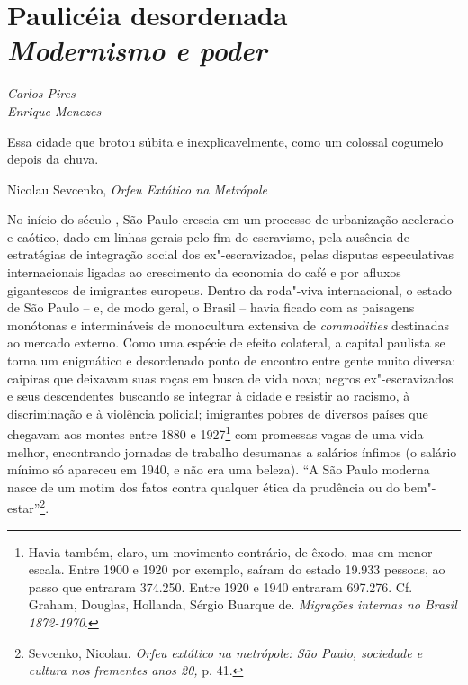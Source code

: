 \chapter*{Paulicéia desordenada\\ \emph{Modernismo e poder}}

\begin{flushright}
\emph{Carlos Pires\\ Enrique Menezes}
\end{flushright}

\epigraph{Essa cidade que brotou súbita e inexplicavelmente,
como um colossal cogumelo depois da chuva.}{Nicolau Sevcenko, \emph{Orfeu Extático na Metrópole}}

No início do século , São Paulo crescia em um processo de urbanização
acelerado e caótico, dado em linhas gerais pelo fim do escravismo, pela
ausência de estratégias de integração social dos ex"-escravizados, pelas
disputas especulativas internacionais ligadas ao crescimento da economia
do café e por afluxos gigantescos de imigrantes europeus. Dentro da
roda"-viva internacional, o estado de São Paulo -- e, de modo geral, o
Brasil -- havia ficado com as paisagens monótonas e intermináveis de
monocultura extensiva de \emph{commodities} destinadas ao mercado
externo. Como uma espécie de efeito colateral, a capital paulista se
torna um enigmático e desordenado ponto de encontro entre gente muito
diversa: caipiras que deixavam suas roças em busca de vida nova; negros
ex"-escravizados e seus descendentes buscando se integrar à cidade e
resistir ao racismo, à discriminação e à violência policial; imigrantes
pobres de diversos países que chegavam aos montes entre 1880 e
1927\footnote{Havia também, claro, um movimento contrário, de êxodo, mas
  em menor escala. Entre 1900 e 1920 por exemplo, saíram do estado
  19.933 pessoas, ao passo que entraram 374.250. Entre 1920 e 1940
  entraram 697.276. Cf. Graham, Douglas, Hollanda, Sérgio Buarque de.
  \emph{Migrações internas no Brasil 1872-1970}.} com promessas vagas de
uma vida melhor, encontrando jornadas de trabalho desumanas a salários
ínfimos (o salário mínimo só apareceu em 1940, e não era uma beleza).
``A São Paulo moderna nasce de um motim dos fatos contra qualquer ética
da prudência ou do bem"-estar''\footnote{Sevcenko, Nicolau. \emph{Orfeu
  extático na metrópole: São Paulo, sociedade e cultura nos frementes
  anos 20,} p. 41.}.

